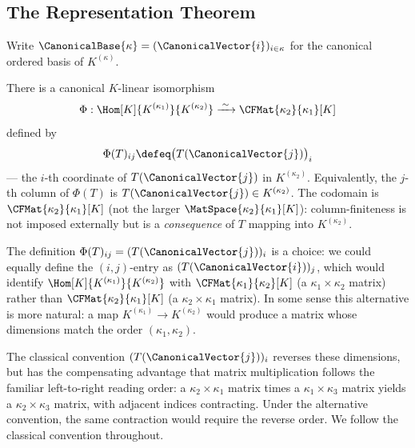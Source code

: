 
\newpage
\subsection{The Representation Theorem}

Write $\CanonicalBase{\kappa} = (\CanonicalVector{i})_{i \in \kappa}$ for the canonical ordered basis of
$K^{(\kappa)}$.

\begin{theorem}
\label{thm:rep-thm}
    There is a canonical $K$-linear isomorphism
    \[
        \Phi: \Hom[K]{K^{(\kappa_1)}}{K^{(\kappa_2)}} \xrightarrow{\;\sim\;}
        \CFMat{\kappa_2}{\kappa_1}[K]
    \]
    defined by
    \[
        \Phi(T)_{ij} \defeq \bigl(T(\CanonicalVector{j})\bigr)_i
    \]
    --- the $i$-th coordinate of $T(\CanonicalVector{j})$ in $K^{(\kappa_2)}$.
    Equivalently, the $j$-th column of $\Phi(T)$ is $T(\CanonicalVector{j}) \in K^{(\kappa_2)}$.
    The codomain is $\CFMat{\kappa_2}{\kappa_1}[K]$ (not the larger
    $\MatSpace{\kappa_2}{\kappa_1}[K]$): column-finiteness is not imposed externally but is a
    \emph{consequence} of $T$ mapping into $K^{(\kappa_2)}$.
\end{theorem}

\begin{remark}
    The definition $\Phi(T)_{ij} = (T(\CanonicalVector{j}))_i$ is a choice: we could equally
    define the $(i,j)$-entry as $(T(\CanonicalVector{i}))_j$, which would identify
    $\Hom[K]{K^{(\kappa_1)}}{K^{(\kappa_2)}}$ with $\CFMat{\kappa_1}{\kappa_2}[K]$ (a
    $\kappa_1 \times \kappa_2$ matrix) rather than $\CFMat{\kappa_2}{\kappa_1}[K]$ (a
    $\kappa_2 \times \kappa_1$ matrix). In some sense this alternative is more natural: a map
    $K^{(\kappa_1)} \to K^{(\kappa_2)}$ would produce a matrix whose dimensions match the
    order $(\kappa_1, \kappa_2)$.

    The classical convention $(T(\CanonicalVector{j}))_i$ reverses these dimensions, but has the compensating
    advantage that matrix multiplication follows the familiar left-to-right reading order:
    a $\kappa_2 \times \kappa_1$ matrix times a $\kappa_1 \times \kappa_3$ matrix yields a
    $\kappa_2 \times \kappa_3$ matrix, with adjacent indices contracting. Under the alternative
    convention, the same contraction would require the reverse order. We follow the classical
    convention throughout.
\end{remark}

